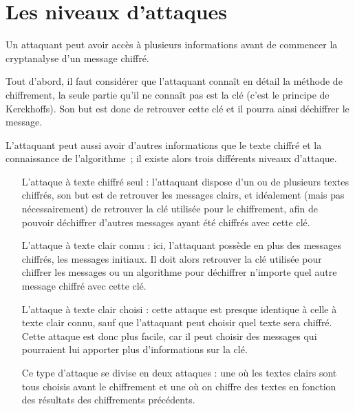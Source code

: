 \section{Les niveaux d'attaques}
Un attaquant peut avoir accès à plusieurs informations avant de
commencer la crypt\-analyse d'un message chiffré.

Tout d'abord, il faut considérer que l'attaquant connaît en détail
la méthode de chiffrement, la seule partie qu'il ne connaît pas
est la clé (c'est le principe de
Kerckhoffs). Son but est donc de
retrouver cette clé et il pourra ainsi déchiffrer le message.

L'attaquant peut aussi avoir d'autres informations que le texte
chiffré et la connaissance de l'algorithme~; il existe alors trois
différents niveaux d'attaque.

\begin{itemize}
  \renewcommand{\makelabel}[1]{\sffamily\textbf{#1}}
  \item[L'attaque à texte chiffré seul] :
    l'attaquant dispose d'un ou de plusieurs textes chiffrés, son but
    est de retrouver les messages clairs, et idéalement (mais pas
    nécessairement) de retrouver la clé utilisée pour le chiffrement,
    afin de pouvoir déchiffrer d'autres messages ayant été chiffrés
    avec cette clé.

  \item[L'attaque à texte clair connu] :
    ici, l'attaquant possède en plus des messages chiffrés, les
    messages initiaux. Il doit alors retrouver la clé utilisée pour 
    chiffrer les messages ou un algorithme pour déchiffrer n'importe
    quel autre message chiffré avec cette clé. 

  \item[L'attaque à texte clair choisi] :
    cette attaque est presque identique à celle à texte clair connu,
    sauf que l'attaquant peut choisir quel texte sera chiffré. Cette
    attaque est donc plus facile, car il peut choisir des messages qui
    pourraient lui apporter plus d'informations sur la clé.

    Ce type d'attaque se divise en deux attaques : une où les textes
    clairs sont tous choisis avant le chiffrement et une où on
    chiffre des textes en fonction des résultats des chiffrements
    précédents.

\end{itemize}
